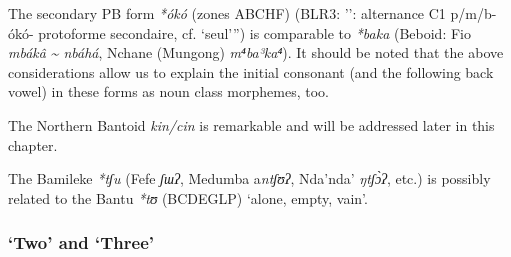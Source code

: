 The secondary PB form \textit{*ókó} (zones ABCHF) (BLR3: ’’\citealt{Janssens1994}: alternance C1 p/m/b-ókó- protoforme secondaire, cf. `seul'”) is comparable to \textit{*baka} (Beboid: Fio \textit{mbákâ} \textit{{\textasciitilde} nbáhá}, Nchane (Mungong) \textit{m⁴ba³ka⁴}). It should be noted that the above considerations allow us to explain the initial consonant (and the following back vowel) in these forms as noun class morphemes, too. 

The Northern Bantoid \textit{kin/cin} is remarkable and will be addressed later in this chapter. 

The Bamileke \textit{*tʃu} (Fefe \textit{ʃɯ}\textit{ʔ}, Medumba a\textit{ntʃʊ}\textit{ʔ}, Nda'nda' \textit{ŋtʃ{\`{ɔ}}ʔ}, etc.) is possibly related to the Bantu \textit{*tʊ} (BCDEGLP) ‘alone, empty, vain’. 

\clearpage
\subsubsection{‘Two’ and ‘Three’} %


